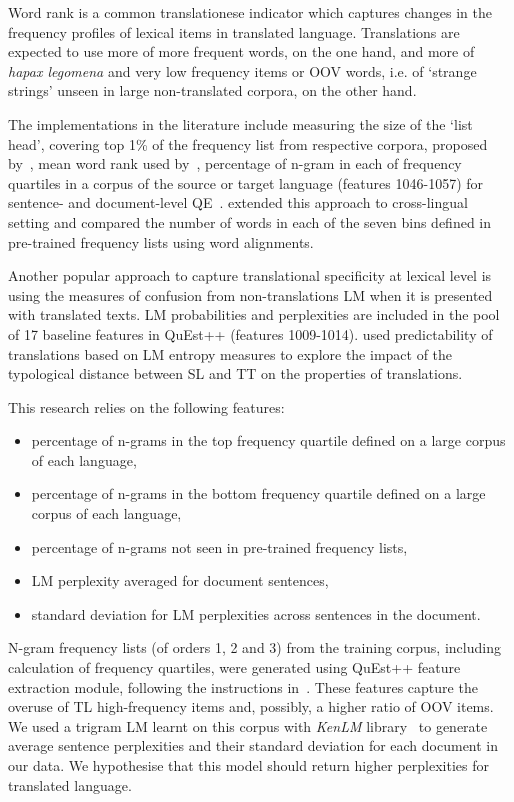 Word rank is a common translationese indicator which captures changes in the frequency profiles of lexical items in translated language. Translations are expected to use more of more frequent words, on the one hand, and more of \textit{hapax legomena} and very low frequency items or \gls{OOV} words, i.e. of `strange strings' unseen in large non-translated corpora, on the other hand. 

The implementations in the literature include measuring the size of the `list head', covering top 1\% of the frequency list from respective corpora, proposed by~\citet{Laviosa1998}, mean word rank used by~\citet{Volansky2015}, percentage of n-gram in each of frequency quartiles in a corpus of the source or target language (features 1046-1057) for sentence- and document-level \gls{QE}~\cite{Scarton2016}. \citet{Sominsky2019} extended this approach to cross-lingual setting and compared the number of words in each of the seven bins defined in pre-trained frequency lists using word alignments.

Another popular approach to capture translational specificity at lexical level is using the measures of confusion from non-translations \gls{LM} when it is presented with translated texts. \gls{LM} probabilities and perplexities are included in the pool of 17 baseline features in QuEst++ (features 1009-1014).
\cite{Nikolaev2020} used predictability of translations based on LM entropy measures to explore the impact of the typological distance between SL and TT on the properties of translations. 

\label{pg:ngrams}
This research relies on the following features:
\begin{itemize}\compresslist{}
	\item percentage of n-grams in the top frequency quartile defined on a large corpus of each language,
	\item percentage of n-grams in the bottom frequency quartile defined on a large corpus of each language,
	\item percentage of n-grams not seen in pre-trained frequency lists,
	\item LM perplexity averaged for document sentences,
	\item standard deviation for LM perplexities across sentences in the document. 
\end{itemize}

N-gram frequency lists (of orders 1, 2 and 3) from the training corpus, including calculation of frequency quartiles, were generated using QuEst++ feature extraction module, following the instructions in~\citet{Specia2016}.
These features capture the overuse of TL high-frequency items and, possibly, a higher ratio of OOV items. 
We used a trigram LM learnt on this corpus with \textit{KenLM} library~\cite{Heafield2011} to generate average sentence perplexities and their standard deviation for each document in our data. We hypothesise that this model should return higher perplexities for translated language. 

